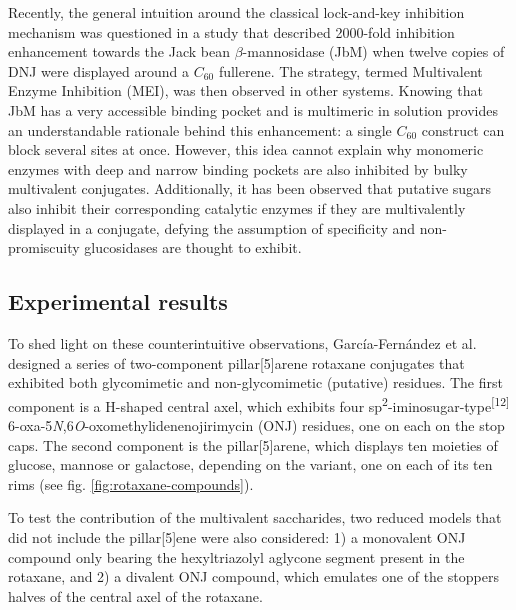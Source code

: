 Recently, the general intuition around the classical lock-and-key inhibition mechanism was questioned in a study that described 2000-fold inhibition enhancement towards the Jack bean $\beta$-mannosidase (JbM) when twelve copies of DNJ were displayed around a $C_{60}$ fullerene.\cite{compain2010glycosidase} The strategy, termed Multivalent Enzyme Inhibition (MEI), was then observed in other systems. Knowing that JbM has a very accessible binding pocket and is multimeric in solution provides an understandable rationale behind this enhancement: a single $C_{60}$  construct can block several sites at once. However, this idea cannot explain why monomeric enzymes with deep and narrow binding pockets are also inhibited by bulky multivalent conjugates. Additionally, it has been observed that putative sugars also inhibit their corresponding catalytic enzymes if they are multivalently displayed in a conjugate, defying the assumption of specificity and non-promiscuity glucosidases are thought to exhibit.

\subsection{Experimental results}

To shed light on these counterintuitive observations, García-Fernández et al.  designed a series of two-component pillar[5]arene rotaxane conjugates that exhibited both glycomimetic and non-glycomimetic (putative) residues. The first component is a H-shaped central axel, which exhibits four sp\textsuperscript{2}-iminosugar-type\textsuperscript{[12]} 6-oxa-5\textit{N},6\textit{O}-oxomethylidenenojirimycin (ONJ) residues, one on each on the stop caps. The second component is the pillar[5]arene, which displays ten moieties of glucose, mannose or galactose, depending on the variant, one on each of its ten rims (see fig. \ref{fig:rotaxane-compounds}).

To test the contribution of the multivalent saccharides, two reduced models that did not include the pillar[5]ene were also considered: 1) a monovalent ONJ compound only bearing the hexyltriazolyl aglycone segment present in the rotaxane, and 2) a divalent ONJ compound, which emulates one of the stoppers halves of the central axel of the rotaxane.



